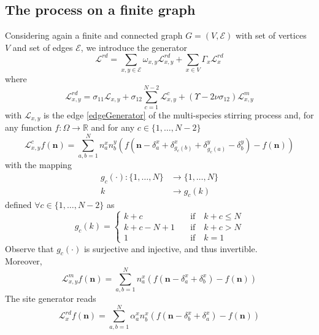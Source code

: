 \documentclass[11pt]{article}
\numberwithin{equation}{section}
\numberwithin{equation}{subsection}
\begin{document}
\subsection{The process on a finite graph}
Considering again a finite and connected graph $G=(V,\mathcal{E})$ with set of vertices $V$ and set of edges $\mathcal{E}$, we introduce the generator
\begin{equation}\label{RDGenerator}
	\mathcal{L}^{rd}=\sum_{x,y\in\mathcal{E}}\omega_{x,y}\mathcal{L}_{x,y}^{rd}+\sum_{x\in V}\Gamma_{x}\mathcal{L}_{x}^{rd}
\end{equation}
where
\begin{equation}\label{edgeGeneratorRD}
	\mathcal{L}_{x,y}^{rd}=\sigma_{11}\mathcal{L}_{x,y}+\sigma_{12}\sum_{c=1}^{N-2}\mathcal{L}_{x,y}^{c}+(\Upsilon-2\nu\sigma_{12})\mathcal{L}_{x,y}^{m}
\end{equation}
with $\mathcal{L}_{x,y}$ is the edge \eqref{edgeGenerator} of the multi-species stirring process and, for any function $f:\Omega\to \mathbb{R}$ and for any $c\in \{1,\ldots,N-2\}$
\begin{equation}
	\mathcal{L}_{x,y}^{c}f(\bm{n})=\sum_{a,b=1}^{N}n_{a}^{x}n_{b}^{y}\left(f(\bm{n}-\delta_{a}^{x}+\delta_{g_{c}(b)}^{x}+\delta_{g_{c}(a)}^{y}-\delta_{b}^{y})-f(\bm{n})\right)
\end{equation}
with the mapping 
\begin{equation}
	\begin{split}
		g_{c}(\cdot):\{1,\ldots,N\}&\to\{1,\ldots,N\}\\
		k&\to g_{c}(k)
	\end{split}
\end{equation}
defined $\forall c\in\{1,\ldots,N-2\}$ as 
\begin{equation}
	g_{c}(k)=\begin{cases}
		k+c \quad &\text{if}\quad k+c\leq N\\
		k+c-N+1\quad &\text{if}\quad k+c>N\\
		1\quad &\text{if}\quad k=1
	\end{cases}
\end{equation}
Observe that $g_{c}(\cdot)$ is surjective and injective, and thus invertible. \\
Moreover,
\begin{equation}
	\mathcal{L}_{x,y}^{m}f(\bm{n})=\sum_{a,b=1}^{N}n_{a}^{x}\left(f(\bm{n}-\delta_{a}^{x}+\delta_{b}^{x})-f(\bm{n})\right)
\end{equation}
The site generator reads
\begin{equation}
	\mathcal{L}_{x}^{rd}f(\bm{n})=\sum_{a,b=1}^{N}\alpha_{a}^{x}n_{b}^{x}\left(f(\bm{n}-\delta_{b}^{x}+\delta_{a}^{x})-f(\bm{n})\right)
\end{equation}
\end{document}
